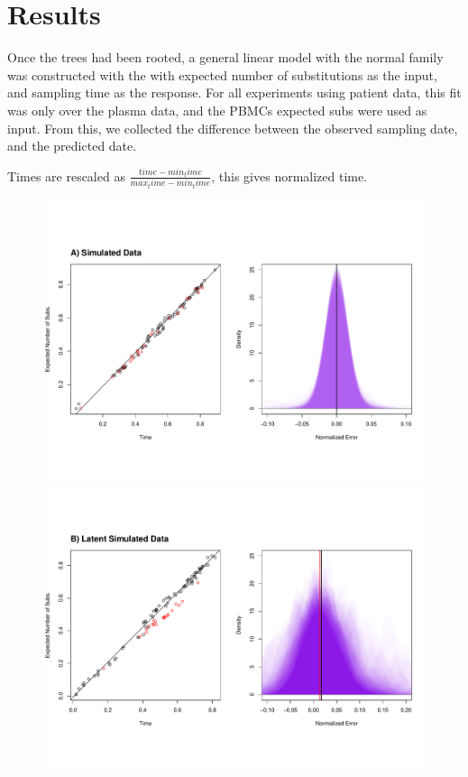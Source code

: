 \section{Results} \label{sec:results}
Once the trees had been rooted, a general linear model with the normal family was constructed with the with expected number of substitutions as the input, and sampling time as the response. For all experiments using patient data, this fit was only over the plasma data, and the PBMCs expected subs were used as input. From this, we collected the difference between the observed sampling date, and the predicted date. 

Times are rescaled as $\frac{time - min_time}{max_time - min_time}$, this gives normalized time.

\begin{figure}[!ht] \label{fig:results1}
	\centering
	\includegraphics[trim=0cm 0cm 0cm 6cm, clip=true, scale=0.25]{figures/simulated.pdf} \\
	\includegraphics[trim=0cm 0cm 0cm 7cm, clip=true,scale=0.25]{figures/simulated_latent.pdf}\\

\end{figure}
